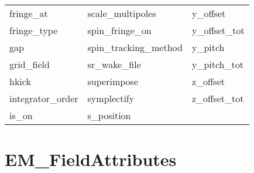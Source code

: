 \begin{tabular}{lll}
fringe_at                   & scale_multipoles            & y_offset                    \\
fringe_type                 & spin_fringe_on              & y_offset_tot                \\
gap                         & spin_tracking_method        & y_pitch                     \\
grid_field                  & sr_wake_file                & y_pitch_tot                 \\
hkick                       & superimpose                 & z_offset                    \\
integrator_order            & symplectify                 & z_offset_tot                \\
is_on                       & s_position                  &                             \\
 \bottomrule
 \end{tabular}
 \vfill
 
 \section{EM_FieldAttributes}
 \label{s:list.em.field}
 

